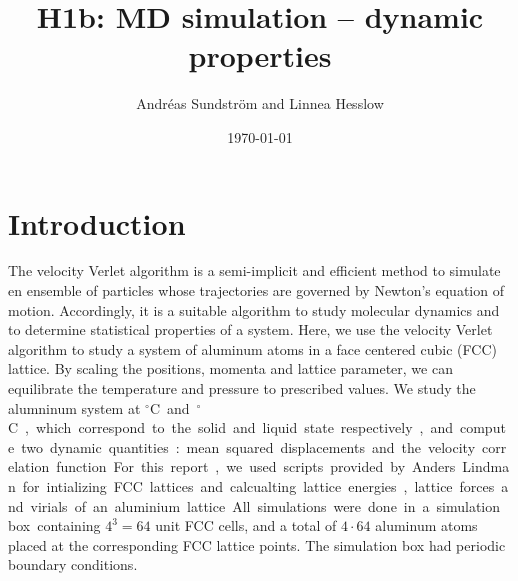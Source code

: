 
\usepackage{units}
\usepackage{physics}

\newcommand{\ee}{\mathrm{e}}
\newcommand{\ii}{\mathrm{i}}

\title{H1b: MD simulation -- dynamic properties}
\author{Andr\'eas Sundstr\"om and Linnea Hesslow}
\date{\today}





\section*{Introduction}

The velocity Verlet algorithm is a semi-implicit and efficient method to simulate en ensemble of particles whose trajectories are governed by Newton's equation of motion. Accordingly, it is a suitable algorithm to study molecular dynamics and to determine statistical properties of a system. Here, we use the velocity Verlet algorithm to study a system of aluminum atoms in a face centered cubic (FCC) lattice. By scaling the positions, momenta and lattice parameter, we can equilibrate the temperature and pressure to prescribed values. We  study the alumninum system at \unit[500]{$^\circ$C} and \unit[700]{$^\circ$C}, which correspond to the solid and liquid state respectively, and compute two dynamic quantities:   
mean squared displacements and the velocity correlation function.

For this report, we used scripts provided by Anders Lindman for intializing FCC lattices and calcualting lattice energies, lattice forces and virials of an aluminium lattice. All simulations were done in a simulation box containing $4^3=64$ unit FCC cells, and a total of $4\cdot64$ aluminum atoms placed at the corresponding FCC lattice points. The simulation box had periodic boundary conditions.

